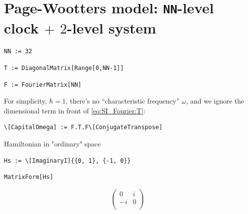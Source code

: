 \section{Page-Wootters model: \texttt{NN}-level clock $+$ $2$-level system}

\begin{Verbatim}
NN := 32
\end{Verbatim}

\begin{Verbatim}
T := DiagonalMatrix[Range[0,NN-1]]
\end{Verbatim}

\begin{Verbatim}
F := FourierMatrix[NN]
\end{Verbatim}

For simplicity, $\hbar = 1$, there's no ``characteristic frequency'' $\omega$,
and we ignore the dimensional term in front of \eqref{eq:SI_Fourier:T}:

\begin{Verbatim}
\[CapitalOmega] := F.T.F\[ConjugateTranspose] 
\end{Verbatim}

Hamiltonian in "ordinary" space
\begin{Verbatim}
Hs := \[ImaginaryI]{{0, 1}, {-1, 0}}
\end{Verbatim}
\begin{Verbatim}
MatrixForm[Hs]
\end{Verbatim}
\[
  \left(
    \begin{array}{cc}
     0 & i \\
     -i & 0 \\
    \end{array}
    \right)
\]

